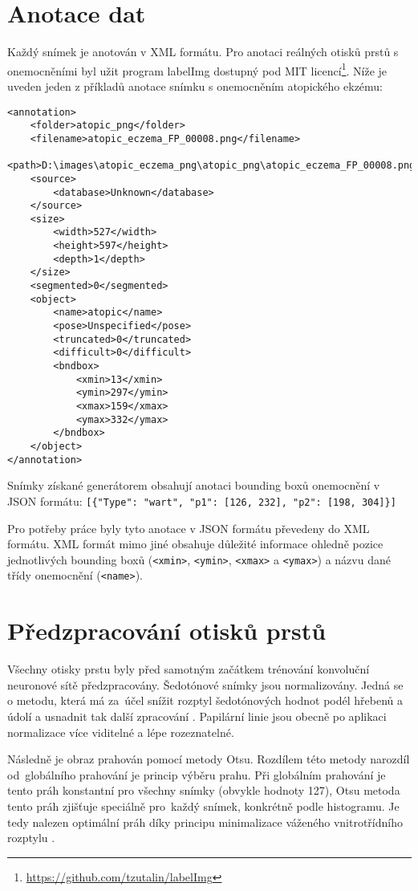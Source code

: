 \section{Anotace dat}
Každý snímek je anotován v XML formátu. Pro anotaci reálných otisků prstů s onemocněními byl užit program labelImg dostupný pod MIT licencí\footnote{\url{https://github.com/tzutalin/labelImg}}. Níže je uveden jeden z příkladů anotace snímku s onemocněním atopického ekzému:

\begin{verbatim}
<annotation>
    <folder>atopic_png</folder>
    <filename>atopic_eczema_FP_00008.png</filename>
    <path>D:\images\atopic_eczema_png\atopic_png\atopic_eczema_FP_00008.png</path>
    <source>
        <database>Unknown</database>
    </source>
    <size>
        <width>527</width>
        <height>597</height>
        <depth>1</depth>
    </size>
    <segmented>0</segmented>
    <object>
        <name>atopic</name>
        <pose>Unspecified</pose>
        <truncated>0</truncated>
        <difficult>0</difficult>
        <bndbox>
            <xmin>13</xmin>
            <ymin>297</ymin>
            <xmax>159</xmax>
            <ymax>332</ymax>
        </bndbox>
    </object>
</annotation>
\end{verbatim}
Snímky získané generátorem obsahují anotaci bounding boxů onemocnění v JSON formátu:
\verb=[{"Type": "wart", "p1": [126, 232], "p2": [198, 304]}]=

Pro potřeby práce byly tyto anotace v JSON formátu převedeny do XML formátu. XML formát mimo jiné obsahuje důležité informace ohledně pozice jednotlivých bounding boxů (\verb=<xmin>=, \verb=<ymin>=, \verb=<xmax>= a \verb=<ymax>=) a názvu dané třídy onemocnění (\verb=<name>=). 





\section{Předzpracování otisků prstů}
Všechny otisky prstu byly před samotným začátkem trénování konvoluční neuronové sítě předzpracovány. Šedotónové snímky jsou normalizovány. Jedná se o metodu, která má za~účel snížit rozptyl šedotónových hodnot podél hřebenů a údolí a usnadnit tak další zpracování \cite{FingerprintImageEnhancement}. Papilární linie jsou obecně po aplikaci normalizace více viditelné a lépe rozeznatelné.

Následně je obraz prahován pomocí metody Otsu. Rozdílem této metody narozdíl od~globálního prahování je princip výběru prahu. Při globálním prahování je tento práh konstantní pro všechny snímky (obvykle hodnoty 127), Otsu metoda tento práh zjišťuje speciálně pro~každý snímek, konkrétně podle histogramu. Je tedy nalezen optimální práh díky principu minimalizace váženého vnitrotřídního rozptylu \cite{ImageThresholding}.

